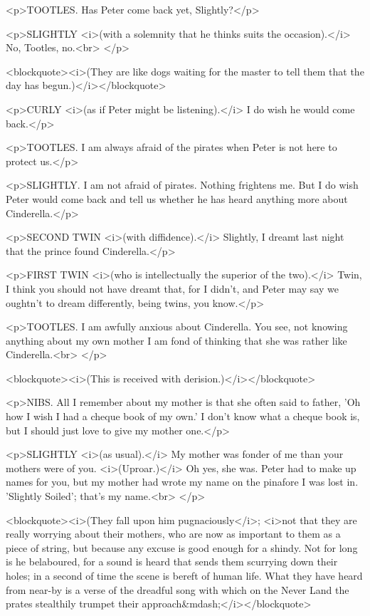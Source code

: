 <p>TOOTLES. Has Peter come back yet, Slightly?</p>

<p>SLIGHTLY <i>(with a solemnity that he thinks suits the
occasion).</i> No, Tootles, no.<br>
</p>

<blockquote><i>(They are like dogs waiting for the master to tell
them that the day has begun.)</i></blockquote>

<p>CURLY <i>(as if Peter might be listening).</i> I do wish he would
come back.</p>

<p>TOOTLES. I am always afraid of the pirates when Peter is not here
to protect us.</p>

<p>SLIGHTLY. I am not afraid of pirates. Nothing frightens me. But I
do wish Peter would come back and tell us whether he has heard
anything more about Cinderella.</p>

<p>SECOND TWIN <i>(with diffidence).</i> Slightly, I dreamt last
night that the prince found Cinderella.</p>

<p>FIRST TWIN <i>(who is intellectually the superior of the two).</i>
Twin, I think you should not have dreamt that, for I didn't, and
Peter may say we oughtn't to dream differently, being twins, you
know.</p>

<p>TOOTLES. I am awfully anxious about Cinderella. You see, not
knowing anything about my own mother I am fond of thinking that she
was rather like Cinderella.<br>
</p>

<blockquote><i>(This is received with derision.)</i></blockquote>

<p>NIBS. All I remember about my mother is that she often said to
father, 'Oh how I wish I had a cheque book of my own.' I don't know
what a cheque book is, but I should just love to give my mother
one.</p>

<p>SLIGHTLY <i>(as usual).</i> My mother was fonder of me than your
mothers were of you. <i>(Uproar.)</i> Oh yes, she was. Peter had to
make up names for you, but my mother had wrote my name on the
pinafore I was lost in. 'Slightly Soiled'; that's my name.<br>
</p>

<blockquote><i>(They fall upon him pugnaciously</i>; <i>not that they
are really worrying about their mothers, who are now as important to
them as a piece of string, but because any excuse is good enough for
a shindy. Not for long is he belaboured, for a sound is heard that
sends them scurrying down their holes; in a second of time the scene
is bereft of human life. What they have heard from near-by is a verse
of the dreadful song with which on the Never Land the prates
stealthily trumpet their approach&mdash;</i></blockquote>

